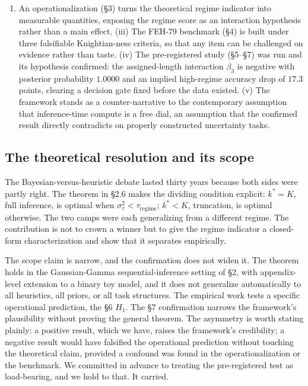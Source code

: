 \documentclass{article}
\providecommand{\tightlist}{\setlength{\itemsep}{0pt}\setlength{\parskip}{0pt}}
\begin{document}
\begin{enumerate}
\def\labelenumi{(\roman{enumi})}
\setcounter{enumi}{1}
\tightlist
\item
  An operationalization (\S{}3) turns the theoretical regime indicator into
  measurable quantities, exposing the regime score as an interaction
  hypothesis rather than a main effect. (iii) The FEH-79 benchmark (\S{}4)
  is built under three falsifiable Knightian-ness criteria, so that any
  item can be challenged on evidence rather than taste. (iv) The
  pre-registered study (\S{}5--\S{}7) was run and its hypothesis confirmed:
  the assigned-length interaction \(\beta_{3}\) is negative with
  posterior probability \(1.0000\) and an implied high-regime accuracy
  drop of \(17.3\) points, clearing a decision gate fixed before the
  data existed. (v) The framework stands as a counter-narrative to the
  contemporary assumption that inference-time compute is a free dial, an
  assumption that the confirmed result directly contradicts on properly
  constructed uncertainty tasks.
\end{enumerate}

\subsection{The theoretical resolution and its
scope}\label{the-theoretical-resolution-and-its-scope}

The Bayesian-versus-heuristic debate lasted thirty years because both
sides were partly right. The theorem in \S{}2.6 makes the dividing
condition explicit: \(k^{*} = K\), full inference, is optimal when
\(\sigma_{\tau}^{2} < \tau_{\text{regime}}\); \(k^{*} < K\), truncation,
is optimal otherwise. The two camps were each generalizing from a
different regime. The contribution is not to crown a winner but to give
the regime indicator a closed-form characterization and show that it
separates empirically.

The scope claim is narrow, and the confirmation does not widen it. The
theorem holds in the Gaussian-Gamma sequential-inference setting of \S{}2,
with appendix-level extension to a binary toy model, and it does not
generalize automatically to all heuristics, all priors, or all task
structures. The empirical work tests a specific operational prediction,
the \S{}6 \(H_{1}\). The \S{}7 confirmation narrows the framework's
plausibility without proving the general theorem. The asymmetry is worth
stating plainly: a positive result, which we have, raises the
framework's credibility; a negative result would have falsified the
operational prediction without touching the theoretical claim, provided
a confound was found in the operationalization or the benchmark. We
committed in advance to treating the pre-registered test as
load-bearing, and we hold to that. It carried.
\end{document}
